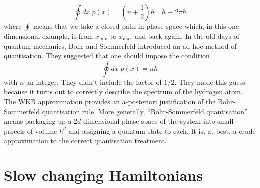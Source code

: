 \[\oint dx \; p(x) = \left( n + \frac{1}{2} \right) h \quad h \equiv 2\pi \hbar \]
where $\oint$ means that we take a closed path in phase space which, in this one-dimensional example, is from $x_{\mathrm{min}}$ to $x_{\mathrm{max}}$ and back again.
In the old days of quantum mechanics, Bohr and Sommerfeld introduced an ad-hoc method of quantisation. They suggested that one should impose the condition
\[\oint dx \; p(x) = n h \]
with $n$ an integer. They didn't include the factor of $1/2$. They made this guess because it turns out to correctly describe the spectrum of the hydrogen atom.  The WKB approximation provides an a-posteriori justification of the Bohr-Sommerfeld quantisation rule.
More generally, ``Bohr-Sommerfeld quantisation'' means packaging up a 2$d$-dimensional phase space of the system into small parcels of volume $h^d$ and assigning a quantum state to each. It is, at best, a crude approximation to the correct quantisation treatment.

\section{Slow changing Hamiltonians}
